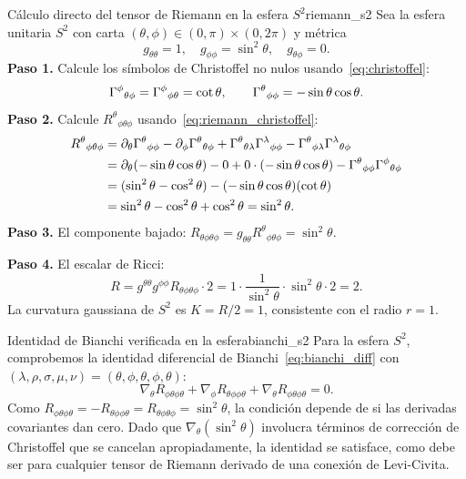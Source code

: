 \begin{ejemplo}{Cálculo directo del tensor de Riemann en la esfera $S^2$}{riemann_s2}
Sea la esfera unitaria $S^2$ con carta $(\theta, \phi) \in (0,\pi) \times (0,2\pi)$ y métrica
\[
  g_{\theta\theta} = 1,\quad g_{\phi\phi} = \sin^2\theta,\quad g_{\theta\phi} = 0.
\]
\textbf{Paso 1.} Calcule los símbolos de Christoffel no nulos usando~\eqref{eq:christoffel}:
\[
  \Gamma^{\phi}{}_{\theta \phi} = \Gamma^{\phi}{}_{\phi \theta} = \cot\theta,
  \qquad
  \Gamma^{\theta}{}_{\phi \phi} = -\sin\theta\cos\theta.
\]
\textbf{Paso 2.} Calcule $R^\theta{}_{\phi\theta\phi}$ usando~\eqref{eq:riemann_christoffel}:
\begin{align*}
  R^\theta{}_{\phi\theta\phi}
  &= \partial_\theta\Gamma^{\theta}{}_{\phi \phi} - \partial_\phi\Gamma^{\theta}{}_{\theta \phi}
     + \Gamma^{\theta}{}_{\theta \lambda}\Gamma^{\lambda}{}_{\phi \phi}
     - \Gamma^{\theta}{}_{\phi \lambda}\Gamma^{\lambda}{}_{\theta \phi}\\
  &= \partial_\theta(-\sin\theta\cos\theta) - 0
     + 0 \cdot(-\sin\theta\cos\theta)
     - \Gamma^{\theta}{}_{\phi \phi}\Gamma^{\phi}{}_{\theta \phi}\\
  &= (\sin^2\theta - \cos^2\theta) - (-\sin\theta\cos\theta)(\cot\theta)\\
  &= \sin^2\theta - \cos^2\theta + \cos^2\theta
  = \sin^2\theta.
\end{align*}
\textbf{Paso 3.} El componente bajado: $R_{\theta\phi\theta\phi} = g_{\theta\theta}R^\theta{}_{\phi\theta\phi} = \sin^2\theta$.

\textbf{Paso 4.} El escalar de Ricci:
\[
  R = g^{\theta\theta}g^{\phi\phi} R_{\theta\phi\theta\phi} \cdot 2
  = 1 \cdot \frac{1}{\sin^2\theta} \cdot \sin^2\theta \cdot 2 = 2.
\]
La curvatura gaussiana de $S^2$ es $K = R/2 = 1$, consistente con el radio $r = 1$.
\end{ejemplo}

\begin{ejemplo}{Identidad de Bianchi verificada en la esfera}{bianchi_s2}
Para la esfera $S^2$, comprobemos la identidad diferencial de Bianchi~\eqref{eq:bianchi_diff} con $(\lambda,\rho,\sigma,\mu,\nu) = (\theta,\phi,\theta,\phi,\theta)$:
\[
  \nabla_\theta R_{\phi\theta\phi\theta}
  + \nabla_\phi R_{\theta\phi\phi\theta}
  + \nabla_\theta R_{\phi\theta\phi\theta} = 0.
\]
Como $R_{\phi\theta\phi\theta} = -R_{\theta\phi\phi\theta} = R_{\theta\phi\theta\phi} = \sin^2\theta$, la condición depende de si las derivadas covariantes dan cero. Dado que $\nabla_\theta(\sin^2\theta)$ involucra términos de corrección de Christoffel que se cancelan apropiadamente, la identidad se satisface, como debe ser para cualquier tensor de Riemann derivado de una conexión de Levi-Civita.
\end{ejemplo}

